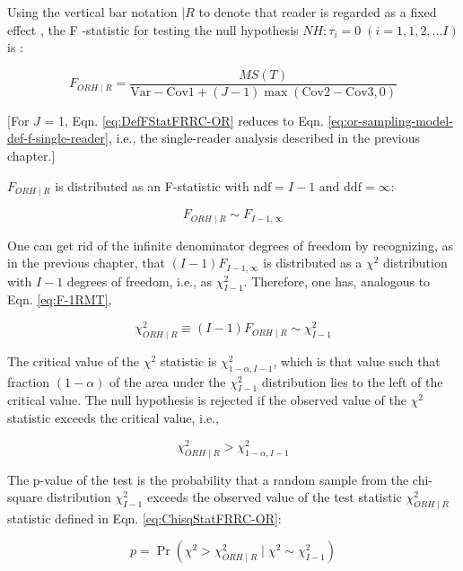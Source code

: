 \documentclass[
]{book}
\begin{document}
Using the vertical bar notation \(\mid R\) to denote that reader is regarded as a fixed effect \citep{RN1124}, the F -statistic for testing the null hypothesis \(NH: \tau_i = 0 \; (i=1,1,2,...I)\) is \citep{RN1865}:

\begin{equation}
F_{ORH \mid R}=\frac{MS(T)}{\text{Var}-\text{Cov1}+(J-1)\max(\text{Cov2}-\text{Cov3},0)}
\label{eq:DefFStatFRRC-OR}
\end{equation}

{[}For \(J\) = 1, Eqn. \eqref{eq:DefFStatFRRC-OR} reduces to Eqn. \eqref{eq:or-sampling-model-def-f-single-reader}, i.e., the single-reader analysis described in the previous chapter.{]}

\(F_{ORH \mid R}\) is distributed as an F-statistic with \(\text{ndf} = I-1\) and \(\text{ddf} = \infty\):

\begin{equation}
F_{ORH \mid R} \sim F_{I-1,\infty}
\label{eq:FStatDistrFRRC-OR}
\end{equation}

One can get rid of the infinite denominator degrees of freedom by recognizing, as in the previous chapter, that \((I-1) F_{I-1,\infty}\) is distributed as a \(\chi^2\) distribution with \(I-1\) degrees of freedom, i.e., as \(\chi^2_{I-1}\). Therefore, one has, analogous to Eqn. \eqref{eq:F-1RMT},

\begin{equation}
\chi^2_{ORH \mid R} \equiv (I-1)F_{ORH \mid R} \sim \chi^2_{I-1}
\label{eq:ChisqStatFRRC-OR}
\end{equation}

The critical value of the \(\chi^2\) statistic is \(\chi^2_{1-\alpha,I-1}\), which is that value such that fraction \((1-\alpha)\) of the area under the \(\chi^2_{I-1}\) distribution lies to the left of the critical value. The null hypothesis is rejected if the observed value of the \(\chi^2\) statistic exceeds the critical value, i.e.,

\[\chi^2_{ORH \mid R} > \chi^2_{1-\alpha,I-1}\]

The p-value of the test is the probability that a random sample from the chi-square distribution \(\chi^2_{I-1}\) exceeds the observed value of the test statistic \(\chi^2_{ORH \mid R}\) statistic defined in Eqn. \eqref{eq:ChisqStatFRRC-OR}:

\begin{equation}
p=\Pr(\chi^2 > \chi^2_{ORH \mid R} \mid \chi^2 \sim \chi^2_{I-1})
\label{eq:pValueFRRC-OR}
\end{equation}
\end{document}
